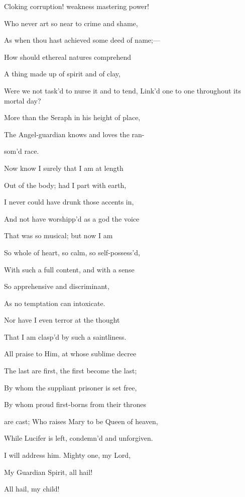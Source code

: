 Cloking corruption! weakness
mastering power!

Who never art so near to crime and shame,

As when thou hast achieved some deed of name;—

How should ethereal natures comprehend

A thing made up of spirit and
of clay,

Were we not task'd to nurse it and to tend, Link'd one to one throughout
its mortal day?

More than the Seraph in his height of place,

The Angel-guardian knows and loves the ran-

som'd race.


Now know I surely that I am at length

Out of the body; had I part with earth,

I never could have drunk those accents in,

And not have worshipp'd as a god the voice

That was so musical; but now I am

So whole of heart, so calm, so self-possess'd,

With such a full content, and with a sense

So apprehensive and discriminant,

As no temptation can intoxicate.

Nor have I even terror at the thought

That I am clasp'd by such a saintliness.


All praise to Him, at whose sublime decree

The last are first, the first
become the last;

By whom the suppliant prisoner is set free,

By whom proud first-borns from
their thrones

are cast; Who raises Mary to be Queen of heaven,

While Lucifer is left, condemn'd and unforgiven.


I will address him. Mighty one, my Lord,

My Guardian Spirit, all hail!


All hail, my child!

